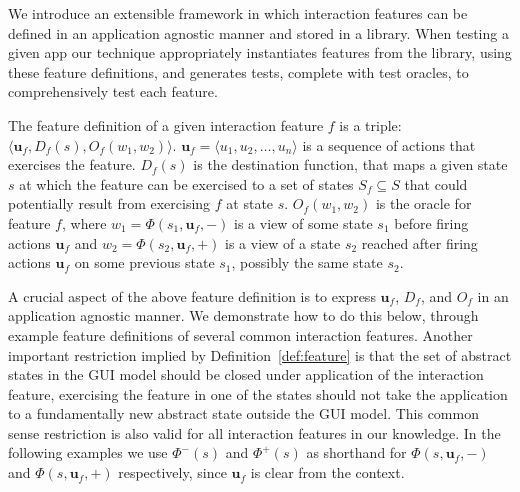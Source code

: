 \label{sec:featureDefinition}

We introduce an extensible framework in which interaction features can be defined in an application agnostic manner and stored in a library. When testing a given app our technique appropriately instantiates features from the library, using these feature definitions, and generates tests, complete with test oracles, to comprehensively test each feature.

\begin{mydef}
\label{def:feature}
The feature definition of a given interaction feature $f$ is a triple: $\langle \mathbf{u}_f, D_f(s), O_f(w_1, w_2) \rangle$. %
$\mathbf{u}_f = \langle u_1, u_2, \dots, u_n \rangle$ is a sequence of actions that exercises the feature. $D_f(s)$ is the destination function, that maps a given state $s$ at which the feature can be exercised to a set of states $S_f \subseteq S$ that could potentially result from exercising $f$ at state $s$. $O_f(w_1, w_2)$ is the oracle for feature $f$, where $w_1 = \Phi(s_1, \mathbf{u}_f, -)$ is a view of some state $s_1$
before firing actions $\mathbf{u}_f$ and $w_2=\Phi(s_2, \mathbf{u}_f, +)$ is a view of a state $s_2$ reached after firing actions $\mathbf{u}_f$ on some previous state $s_1$, possibly the same state $s_2$.
\end{mydef}
\vspace*{-2ex}

A crucial aspect of the above feature definition is to express $\mathbf{u}_f$, $D_f$, and $O_f$ in an application agnostic manner. We demonstrate how to do this below, through example feature definitions of several common interaction features. Another important restriction implied by Definition~\ref{def:feature} is that the set of abstract states in the GUI model should be closed under application of the interaction feature, \ie exercising the feature in one of the states should not take the application to a fundamentally new abstract state outside the GUI model. This common sense restriction is also valid for all interaction features in our knowledge. In the following examples we use $\Phi^-(s)$ and $\Phi^+(s)$ as shorthand for $\Phi(s, \mathbf{u}_f, -)$ and $\Phi(s, \mathbf{u}_f, +)$ respectively, since $\mathbf{u}_f$ is clear from the context.

